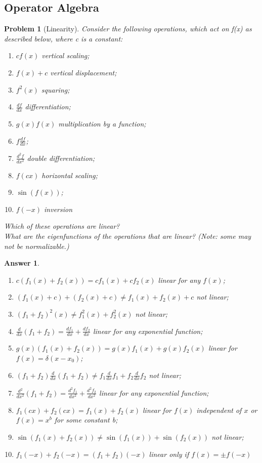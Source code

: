 \documentclass[a4paper]{article}
\newtheorem{ans}{Answer}[section]
\theoremstyle{new}
\newtheorem{qns}{Problem}[section]
\begin{document}
\subsection*{Operator Algebra}
\begin{qns}[Linearity]
Consider the following operations, which act on f(x) as described below, where c is a
constant:
\begin{enumerate}[label=(\alph*)]
    \item $cf(x)$ vertical scaling;
    \item $f(x)+c$ vertical displacement;
    \item $f^2(x)$ squaring;
    \item $\frac{df}{dx}$ differentiation;
    \item $g(x)f(x)$ multiplication by a function;
    \item $f\frac{df}{dx}$;
    \item $\frac{d^2f}{dx^2}$ double differentiation;
    \item $f(cx)$ horizontal scaling;
    \item $\sin(f(x))$;
    \item $f(-x)$ inversion
\end{enumerate}
Which of these operations are linear?\\[5pt]
What are the eigenfunctions of the operations that are linear? (Note: some may not be normalizable.)
\end{qns}
\begin{ans}\leavevmode
\begin{enumerate}[label=(\alph*)]
    \item $c(f_1(x)+f_2(x))=cf_1(x)+cf_2(x)$ linear for any $f(x)$;
    \item $(f_1(x)+c)+(f_2(x)+c)\neq f_1(x)+f_2(x)+c$ not linear;
    \item $(f_1+f_2)^2(x)\neq f_1^2(x)+f_2^2(x)$ not linear;
    \item $\frac{d}{dx}(f_1+f_2)=\frac{df_1}{dx}+\frac{df_2}{dx}$ linear for any exponential function;
    \item $g(x)(f_1(x)+f_2(x))=g(x)f_1(x)+g(x)f_2(x)$ linear for $f(x)=\delta(x-x_0)$;
    \item $(f_1+f_2)\frac{d}{dx}(f_1+f_2)\neq f_1\frac{d}{dx}f_1+f_2\frac{d}{dx}f_2$ not linear;
    \item $\frac{d^2}{dx^2}(f_1+f_2)=\frac{d^2f_1}{dx^2}+\frac{d^2f_2}{dx^2}$ linear for any exponential function;
    \item $f_1(cx)+f_2(cx)=f_1(x)+f_2(x)$ linear for $f(x)$ independent of $x$ or $f(x)=x^b$ for some constant b;
    \item $\sin(f_1(x)+f_2(x))\neq\sin(f_1(x))+\sin(f_2(x))$ not linear;
    \item $f_1(-x)+f_2(-x)=(f_1+f_2)(-x)$ linear only if $f(x)=\pm f(-x)$
\end{enumerate}
\end{ans}
\end{document}
